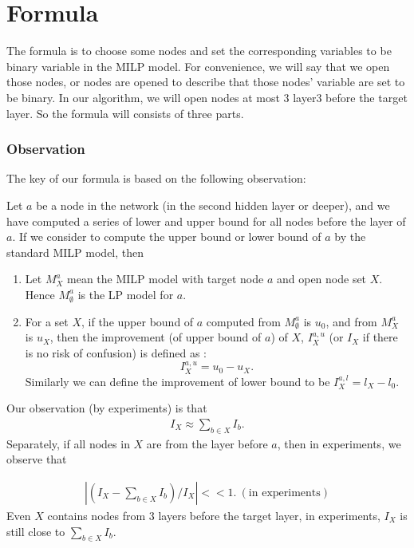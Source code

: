 \section*{Formula}

The formula is to choose some nodes and set the corresponding variables to be binary variable in the MILP model. For convenience, we will say that we open those nodes, or nodes are opened to describe that those nodes' variable are set to be binary. In our algorithm, we will open nodes at most 3 layer3 before the target layer. So the formula will consists of three parts.

\subsubsection*{Observation}

The key of our formula is based on the following observation:

\begin{definition}[Improvement]
	
	Let $a$ be a node in the network (in the second hidden layer or deeper), and we have computed a series of lower and upper bound for all nodes before the layer of $a$. If we consider to compute the upper bound or lower bound of $a$ by the standard MILP model, then
	
	\begin{enumerate}
		\item Let $M^a_X$ mean the MILP model with target node $a$ and open node set $X$. Hence $M^a_{\emptyset}$ is the LP model for $a$.
		
		\item For a set $X$, if the upper bound of $a$ computed from $M^a_{\emptyset}$ is $u_0$, and from $M^a_X$ is $u_X$, then the improvement (of upper bound of $a$) of $X$, $I_X^{a,u}$ (or $I_X$ if there is no risk of confusion) is defined as : $$I_X^{a,u} = u_0-u_X.$$ Similarly we can define the improvement of lower bound to be $I_X^{a,l} = l_X-l_0$.
	\end{enumerate}
\end{definition}



Our observation (by experiments) is that \begin{align*}
	I_X \approx \sum_{b\in X} I_b.
\end{align*} Separately, if all nodes in $X$ are from the layer before $a$, then in experiments, we observe that 

\begin{align}
	|(I_X - \sum_{b\in X} I_b)/I_X| << 1. \ (\text{in experiments})
\end{align} Even $X$ contains nodes from 3 layers before the target layer, in experiments, $I_X$ is still close to $\sum_{b\in X} I_b$.

